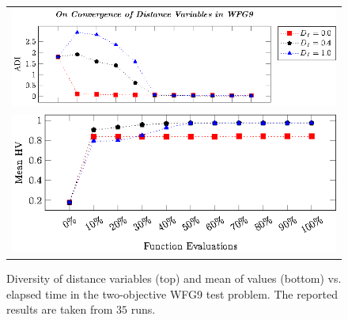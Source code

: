\begin{figure}[t]
\centering
\begin{tabular}{l}
 \includegraphics[scale=0.75]{images/Diversity_Long_Term_tikz_WFG9-figure0.eps}\\[0cm]%
 \includegraphics[scale=0.75]{images/Diversity_Long_Term_tikz_WFG9-figure1.eps}\\[0cm]%
\end{tabular}
\caption{Diversity of distance variables (top) and mean of \HV{} values (bottom) vs. elapsed time in the two-objective WFG9 test problem. The reported results are taken from $35$ runs.}\label{fig:WFG9_Diversity}
\end{figure}



